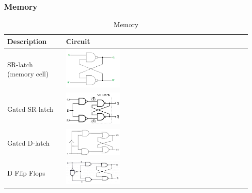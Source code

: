 \documentclass{article}
\begin{document}
\subsubsection{Memory}
\begin{table}[h!]
    \centering
    \begin{tabular}{ | m{5cm} | m{5cm} | }
        \hline
        Description & Circuit \\
        \hline
        SR-latch (memory cell)    
        &
        \includegraphics[width=0.3\textwidth]{image/SR_latch.png} \\
        \hline
        Gated SR-latch
        &
        \includegraphics[width=0.3\textwidth]{image/Gated_SR_Latch.png} \\
        \hline
        Gated D-latch
        &
        \includegraphics[width=0.3\textwidth]{image/Gated_D_latch.png} \\
        \hline
        D Flip Flops
        &
        \includegraphics[width=0.3\textwidth]{image/D_Flip_Flop.png} \\
        \hline
    \end{tabular}
    \caption{Memory }\label{tbl:memory}
\end{table}

\newpage
\end{document}

